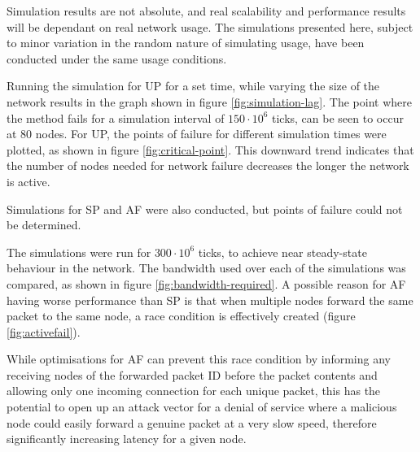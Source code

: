 			Simulation results are not absolute, and real scalability and performance results will be dependant on real network usage. The simulations presented here, subject to minor variation in the random nature of simulating usage, have been conducted under the same usage conditions.
			
			Running the simulation for UP for a set time, while varying the size of the network results in the graph shown in figure \ref{fig:simulation-lag}. The point where the method fails for a simulation interval of $150\cdot10^6$ ticks, can be seen to occur at 80 nodes. For UP, the points of failure for different simulation times were plotted, as shown in figure \ref{fig:critical-point}. This downward trend indicates that the number of nodes needed for network failure decreases the longer the network is active.
			
			Simulations for SP and AF were also conducted, but points of failure could not be determined.
			
			The simulations were run for $300\cdot10^6$ ticks, to achieve near steady-state behaviour in the network. The bandwidth used over each of the simulations was compared, as shown in figure \ref{fig:bandwidth-required}. A possible reason for AF having worse performance than SP is that when multiple nodes forward the same packet to the same node, a race condition is effectively created (figure \ref{fig:activefail}).
			
			While optimisations for AF can prevent this race condition by informing any receiving nodes of the forwarded packet ID before the packet contents and allowing only one incoming connection for each unique packet, this has the potential to open up an attack vector for a denial of service where a malicious node could easily forward a genuine packet at a very slow speed, therefore significantly increasing latency for a given node.
			
